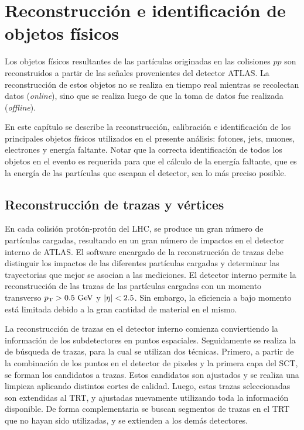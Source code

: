 \chapter{Reconstrucción e identificación de objetos físicos}
\label{cap:objetos}

Los objetos físicos resultantes de las partículas originadas en las colisiones
$pp$ son reconstruidos a partir de las señales provenientes del detector ATLAS.
La reconstrucción de estos objetos no se realiza en tiempo real mientras se
recolectan datos (\emph{online}), sino que se realiza luego de que la toma de
datos fue realizada (\emph{offline}).

En este capítulo se describe la reconstrucción, calibración e identificación de
los principales objetos físicos utilizados en el presente análisis: fotones,
jets, muones, electrones y energía faltante. Notar que la correcta
identificación de todos los objetos en el evento es requerida para que el
cálculo de la energía faltante, que es la energía de las partículas que escapan
el detector, sea lo más preciso posible.


\section{Reconstrucción de trazas y vértices}
\label{sec:obj_vertex}

En cada colisión protón-protón del LHC, se produce un gran número de partículas
cargadas, resultando en un gran número de impactos en el detector interno de
ATLAS. El software encargado de la reconstrucción de trazas debe distinguir los
impactos de las diferentes partículas cargadas y determinar las trayectorias que
mejor se asocian a las mediciones. El detector interno permite la reconstrucción
de las trazas de las partículas cargadas con un momento transverso $\pt>0.5 \gev$
y $\abseta < 2.5$. Sin embargo, la eficiencia a bajo momento está
limitada debido a la gran cantidad de material en el mismo.

La reconstrucción de trazas en el detector interno comienza conviertiendo la
información de los subdetectores en puntos espaciales. Seguidamente se realiza
la de búsqueda de trazas, para la cual se utilizan dos técnicas. Primero, a
partir de la combinación de los puntos en el detector de pixeles y la primera
capa del SCT, se forman los candidatos a trazas. Estos candidatos son ajustados
y se realiza una limpieza aplicando distintos cortes de calidad. Luego, estas
trazas seleccionadas son extendidas al TRT, y ajustadas nuevamente utilizando
toda la información disponible. De forma complementaria se buscan segmentos de
trazas en el TRT que no hayan sido utilizadas, y se extienden a los demás
detectores.

